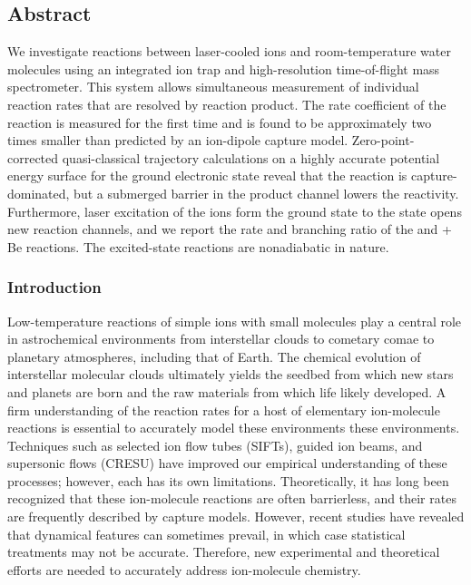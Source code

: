 \subsection{Abstract}
We investigate reactions between laser-cooled  ions and room-temperature water molecules using an integrated ion trap and high-resolution time-of-flight mass spectrometer. This system allows simultaneous measurement of individual reaction rates that are resolved by reaction product. The rate coefficient of the  reaction is measured for the first time and is found to be approximately two times smaller than predicted by an ion-dipole capture model. Zero-point-corrected quasi-classical trajectory calculations on a highly accurate potential energy surface for the ground electronic state reveal that the reaction is capture-dominated, but a submerged barrier in the product channel lowers the reactivity. Furthermore, laser excitation of the ions form the  ground state to the  state opens new reaction channels, and we report the rate and branching ratio of the  and  + Be reactions. The excited-state reactions are nonadiabatic in nature.

\subsubsection{Introduction}

Low-temperature reactions of simple ions with small molecules play a central role in astrochemical environments from interstellar clouds to cometary comae to planetary atmospheres, including that of Earth\cite{Agundez2013,Krasnopolsky2014}. The chemical evolution of interstellar molecular clouds ultimately yields the seedbed from which new stars and planets are born and the raw materials from which life likely developed. A firm understanding of the reaction rates for a host of elementary ion-molecule reactions is essential to accurately model these environments these environments. Techniques such as selected ion flow tubes (SIFTs)\cite{Adams1976}, guided ion beams\cite{Armentrout2002}, and supersonic flows (CRESU)\cite{Sims2002} have improved our empirical understanding of these processes; however, each has its own limitations.\cite{Smith2000,Snow2008} Theoretically, it has long been recognized that these ion-molecule reactions are often barrierless, and their rates are frequently described by capture models.\cite{Gioumousis1958a} However, recent studies have revealed that dynamical features can sometimes prevail,\cite{Lourderaj2008,Li2014,Carrascosa2017} in which case statistical treatments may not be accurate.\cite{Hase2014,Clary1990} Therefore, new experimental and theoretical efforts are needed to accurately address ion-molecule chemistry.

